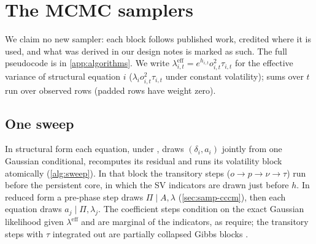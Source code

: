 \section{The MCMC samplers}\label{sec:samplers}

We claim no new sampler: each block follows published work, credited where it is used, and what
was derived in our design notes is marked as such.
The full pseudocode is in \cref{app:algorithms}.
We write $\lambda^{\mathrm{eff}}_{i,t} = e^{h_{i,t}}o_{i,t}^2\tau_{i,t}$ for the effective variance of
structural equation $i$ ($\lambda_i o_{i,t}^2\tau_{i,t}$ under constant volatility); sums over $t$ run over
observed rows (padded rows have weight zero).

\subsection{One sweep}\label{sec:samp-sweep}

In structural form each equation, under , draws $(\delta_i, a_i)$ jointly from one Gaussian
conditional, recomputes its residual and runs its volatility block atomically
(\cref{alg:sweep}).
In that block the transitory steps ($o \to p \to \nu \to \tau$) run before the persistent core, in
which the SV indicators are drawn just before $h$. %
In reduced form a pre-phase step draws $\Pi \mid A, \lambda$ (\cref{sec:samp-cccm}), then each
equation draws $a_j \mid \Pi, \lambda_j$.
The coefficient steps condition on the exact Gaussian likelihood given $\lambda^{\mathrm{eff}}$ and are
marginal of the indicators, as \citet{delnegro2015time} require; the transitory steps with $\tau$
integrated out are partially collapsed Gibbs blocks \citep{vandyk2008partially}. %

